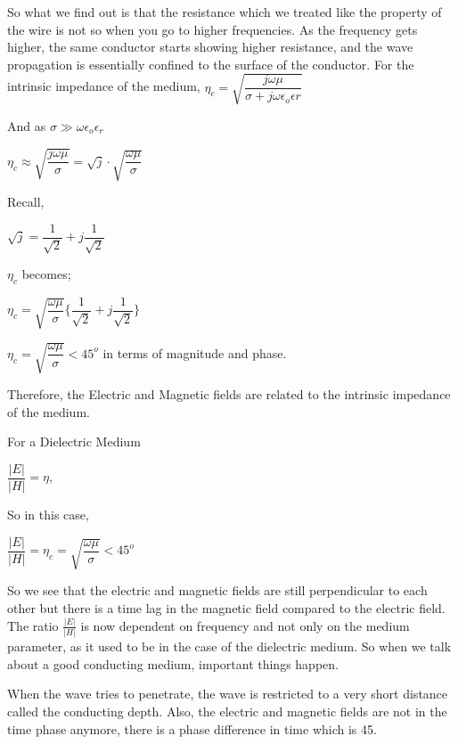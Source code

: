 So what we find out is that the resistance which we treated like the property of the wire is not so when you go to higher frequencies. As the frequency gets higher, the same conductor starts showing higher resistance, and the wave propagation is essentially confined to the surface of the conductor.
For the intrinsic impedance of the medium, $\eta_{c}=\sqrt{\dfrac{j\omega\mu}{\sigma+j\omega\epsilon_{o}\epsilon{r}}}$

And as $\sigma\gg\omega\epsilon_{o}\epsilon_{r}$
\begin{center}
$\eta_{c}\approx\sqrt{\dfrac{j\omega\mu}{\sigma}}=\sqrt{j}\cdot\sqrt{\dfrac{\omega\mu}{\sigma}}$
\end{center}

Recall,
\begin{center}
$\sqrt{j}=\dfrac{1}{\sqrt{2}}+j\dfrac{1}{\sqrt{2}}$
\end{center}

$\eta_{c}$ becomes;
\begin{center}
$\eta_{c}=\sqrt{\dfrac{\omega\mu}{\sigma}}\Bigg\{\dfrac{1}{\sqrt{2}}+j\dfrac{1}{\sqrt{2}}\Bigg\}$
\end{center} 

\begin{center}
$\eta_{c}=\sqrt{\dfrac{\omega\mu}{\sigma}}<45^{o}$ in terms of magnitude and phase.
\end{center}

Therefore, the Electric and Magnetic fields are related to the intrinsic impedance of the medium.\newline

For a Dielectric Medium
\begin{center}
$\dfrac{|E|}{|H|}=\eta,$\newline
\end{center}

So in this case, \newline

$\dfrac{|E|}{|H|}=\eta_{c}=\sqrt{\dfrac{\omega\mu}{\sigma}}<45^{o}$

So we see that the electric and magnetic fields are still perpendicular to each other but there is a time lag in the magnetic field compared to the electric field. The ratio $\frac{|E|}{|H|}$ is now dependent on frequency and not only on the medium parameter, as it used to be in the case of the dielectric medium. So when we talk about a good conducting medium, important things happen.

When the wave tries to penetrate, the wave is restricted to a very short distance called the conducting depth. Also, the electric and magnetic fields are not in the time phase anymore, there is a phase difference in time which is 45\textdegree.


